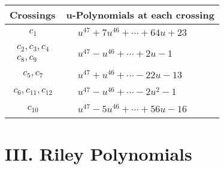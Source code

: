 \documentclass[1p]{elsarticle_modified}
\theoremstyle{definition}
\begin{document}
\begin{tabular}{m{50pt}|m{274pt}}
Crossings & \hspace{64pt}u-Polynomials at each crossing \\
\hline $$\begin{aligned}c_{1}\end{aligned}$$&$\begin{aligned}
&u^{47}+7 u^{46}+\cdots+64 u+23
\end{aligned}$\\
\hline $$\begin{aligned}c_{2},c_{3},c_{4}\\c_{8},c_{9}\end{aligned}$$&$\begin{aligned}
&u^{47}- u^{46}+\cdots+2 u-1
\end{aligned}$\\
\hline $$\begin{aligned}c_{5},c_{7}\end{aligned}$$&$\begin{aligned}
&u^{47}+u^{46}+\cdots-22 u-13
\end{aligned}$\\
\hline $$\begin{aligned}c_{6},c_{11},c_{12}\end{aligned}$$&$\begin{aligned}
&u^{47}- u^{46}+\cdots-2 u^2-1
\end{aligned}$\\
\hline $$\begin{aligned}c_{10}\end{aligned}$$&$\begin{aligned}
&u^{47}-5 u^{46}+\cdots+56 u-16
\end{aligned}$\\
\hline
\end{tabular}\newpage\renewcommand{\arraystretch}{1}
\centering \section*{ III. Riley Polynomials}
\end{document}
